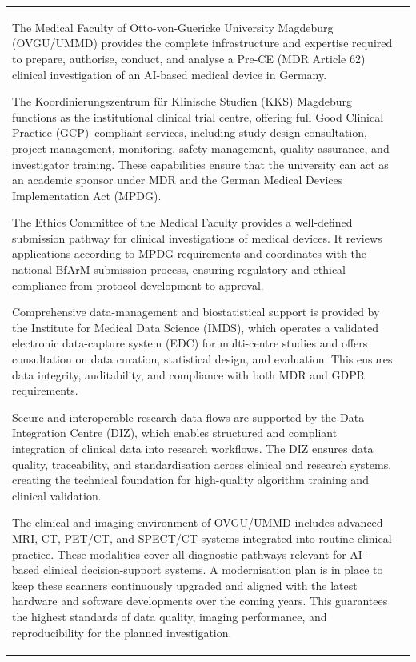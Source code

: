 \documentclass[11pt, a4paper]{article}
\begin{document}
\begin{longtable}{| p{} | p{} |}
The Medical Faculty of Otto-von-Guericke University Magdeburg (OVGU/UMMD) provides the complete infrastructure and expertise required to prepare, authorise, conduct, and analyse a Pre-CE (MDR Article 62) clinical investigation of an AI-based medical device in Germany.

The Koordinierungszentrum für Klinische Studien (KKS) Magdeburg functions as the institutional clinical trial centre, offering full Good Clinical Practice (GCP)–compliant services, including study design consultation, project management, monitoring, safety management, quality assurance, and investigator training. These capabilities ensure that the university can act as an academic sponsor under MDR and the German Medical Devices Implementation Act (MPDG).

The Ethics Committee of the Medical Faculty provides a well-defined submission pathway for clinical investigations of medical devices. It reviews applications according to MPDG requirements and coordinates with the national BfArM submission process, ensuring regulatory and ethical compliance from protocol development to approval.

Comprehensive data-management and biostatistical support is provided by the Institute for Medical Data Science (IMDS), which operates a validated electronic data-capture system (EDC) for multi-centre studies and offers consultation on data curation, statistical design, and evaluation. This ensures data integrity, auditability, and compliance with both MDR and GDPR requirements.

Secure and interoperable research data flows are supported by the Data Integration Centre (DIZ), which enables structured and compliant integration of clinical data into research workflows. The DIZ ensures data quality, traceability, and standardisation across clinical and research systems, creating the technical foundation for high-quality algorithm training and clinical validation.

The clinical and imaging environment of OVGU/UMMD includes advanced MRI, CT, PET/CT, and SPECT/CT systems integrated into routine clinical practice. These modalities cover all diagnostic pathways relevant for AI-based clinical decision-support systems. A modernisation plan is in place to keep these scanners continuously upgraded and aligned with the latest hardware and software developments over the coming years. This guarantees the highest standards of data quality, imaging performance, and reproducibility for the planned investigation.


\end{longtable}
\end{document}

